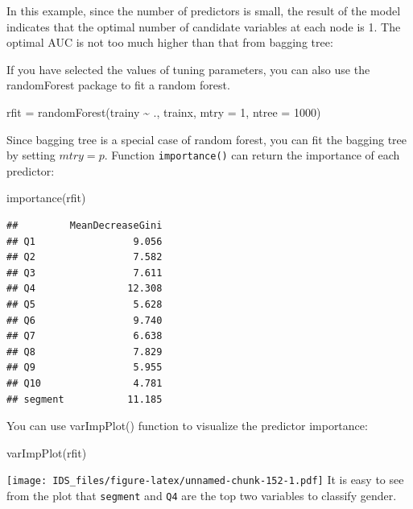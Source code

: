 \documentclass[
  12pt,
]{krantz}
\makeatletter
\newenvironment{Shaded}{\begin{snugshade}}{\end{snugshade}}
\newcommand{\AttributeTok}[1]{\textcolor[rgb]{0.61,0.61,0.61}{#1}}
\newcommand{\DecValTok}[1]{\textcolor[rgb]{0.06,0.06,0.06}{#1}}
\newcommand{\FunctionTok}[1]{\textcolor[rgb]{0,0,0}{#1}}
\newcommand{\NormalTok}[1]{#1}
\newcommand{\OtherTok}[1]{\textcolor[rgb]{0.37,0.37,0.37}{#1}}
\newcommand{\SpecialCharTok}[1]{\textcolor[rgb]{0,0,0}{#1}}
\newenvironment{kframe}{%
\medskip{}
\setlength{\fboxsep}{.8em}
 \def\at@end@of@kframe{}%
 \ifinner\ifhmode%
  \def\at@end@of@kframe{\end{minipage}}%
  \begin{minipage}{\columnwidth}%
 \fi\fi%
 \def\FrameCommand##1{\hskip\@totalleftmargin \hskip-\fboxsep
 \colorbox{shadecolor}{##1}\hskip-\fboxsep
     \hskip-\linewidth \hskip-\@totalleftmargin \hskip\columnwidth}%
 \MakeFramed {\advance\hsize-\width
   \@totalleftmargin\z@ \linewidth\hsize
   \@setminipage}}%
 {\par\unskip\endMakeFramed%
 \at@end@of@kframe}
\renewenvironment{Shaded}{\begin{kframe}}{\end{kframe}}
\makeatother
\begin{document}
In this example, since the number of predictors is small, the result of the model indicates that the optimal number of candidate variables at each node is 1. The optimal AUC is not too much higher than that from bagging tree:

If you have selected the values of tuning parameters, you can also use the randomForest package to fit a random forest.

\begin{Shaded}
\begin{Highlighting}[]
\NormalTok{rfit }\OtherTok{=} \FunctionTok{randomForest}\NormalTok{(trainy }\SpecialCharTok{\textasciitilde{}}\NormalTok{ ., trainx, }\AttributeTok{mtry =} \DecValTok{1}\NormalTok{, }\AttributeTok{ntree =} \DecValTok{1000}\NormalTok{)}
\end{Highlighting}
\end{Shaded}

Since bagging tree is a special case of random forest, you can fit the bagging tree by setting \(mtry=p\). Function \texttt{importance()} can return the importance of each predictor:

\begin{Shaded}
\begin{Highlighting}[]
\FunctionTok{importance}\NormalTok{(rfit)}
\end{Highlighting}
\end{Shaded}

\begin{verbatim}
##         MeanDecreaseGini
## Q1                 9.056
## Q2                 7.582
## Q3                 7.611
## Q4                12.308
## Q5                 5.628
## Q6                 9.740
## Q7                 6.638
## Q8                 7.829
## Q9                 5.955
## Q10                4.781
## segment           11.185
\end{verbatim}

You can use varImpPlot() function to visualize the predictor importance:

\begin{Shaded}
\begin{Highlighting}[]
\FunctionTok{varImpPlot}\NormalTok{(rfit)}
\end{Highlighting}
\end{Shaded}

\texttt{[image: IDS\_files/figure-latex/unnamed-chunk-152-1.pdf]}
It is easy to see from the plot that \texttt{segment} and \texttt{Q4} are the top two variables to classify gender.
\end{document}
